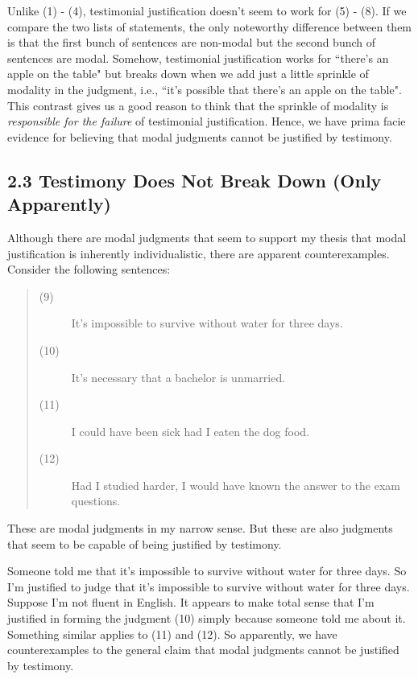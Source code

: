 \documentclass[a4paper,12pt]{article}
\begin{document}
Unlike (1) - (4), testimonial justification doesn't seem to work for (5) - (8). If we compare the two lists of statements, the only noteworthy difference between them is that the first bunch of sentences are non-modal but the second bunch of sentences are modal. Somehow, testimonial justification works for ``there's an apple on the table" but breaks down when we add just a little sprinkle of modality in the judgment, i.e., ``it's possible that there's an apple on the table". This contrast gives us a good reason to think that the sprinkle of modality is \emph{responsible for the failure} of testimonial justification. Hence, we have prima facie evidence for believing that modal judgments cannot be justified by testimony.

\subsection*{2.3 Testimony Does Not Break Down (Only Apparently)}

Although there are modal judgments that seem to support my thesis that modal justification is inherently individualistic, there are apparent counterexamples. Consider the following sentences:

\begin{quote}
\begin{description}
\item[(9)] It's impossible to survive without water for three days.
\item[(10)] It's necessary that a bachelor is unmarried.
\item[(11)] I could have been sick had I eaten the dog food.
\item[(12)] Had I studied harder, I would have known the answer to the exam questions.
\end{description}
\end{quote}

These are modal judgments in my narrow sense. But these are also judgments that seem to be capable of being justified by testimony.

Someone told me that it's impossible to survive without water for three days. So I'm justified to judge that it's impossible to survive without water for three days. Suppose I'm not fluent in English. It appears to make total sense that I'm justified in forming the judgment (10) simply because someone told me about it. Something similar applies to (11) and (12). So apparently, we have counterexamples to the general claim that modal judgments cannot be justified by testimony.
\end{document}
